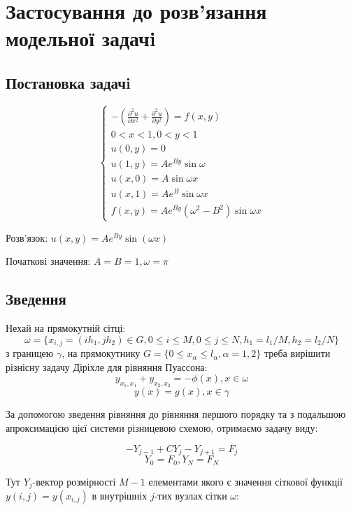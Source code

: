 \chapter{Застосування до розв’язання модельної задачi}

\section{Постановка задачi}

\begin{equation}
    \begin{cases}
        - (\frac{\partial^2 u}{\partial x ^ 2} + \frac{\partial ^2 u}{\partial y^2}) = f(x,y) \\
        0 < x < 1, 0 < y < 1 \\
        u(0,y) = 0 \\
        u(1,y) = A e^{By}\sin \omega \\
        u(x,0) = A \sin \omega x \\
        u(x,1) = A e^B \sin \omega x \\
        f(x,y) = A e^{By} (\omega^2 - B^2)\sin \omega x
    \end{cases}
\end{equation}


Розв'язок: $u(x, y) = A e^{By}\sin(\omega x)$


Початкові значення: $A=B=1, \omega = \pi$

\section{Зведення}

Нехай на прямокутній сітці:
$$ \omega = \{ x_{i,j} = (ih_1, jh_2) \in G, 
0 \le i \le M, 0 \le j \le N, h_1 = l_1 / M, h_2 = l_2 / N \} $$
з границею $\gamma$, на прямокутнику $G = \{0 \le x_\alpha \le l_\alpha, \alpha = 1,2 \}$
треба вирішити різнісну задачу Діріхле для рівняння Пуассона: 
$$ y_{x_1, x_1} + y_{x_2, x_2} = -\phi(x), x\in \omega $$
$$ y(x) = g(x), x \in \gamma $$


За допомогою зведення рівняння до рівняння першого порядку та з подальшою апроксимацією 
цієї системи різницевою схемою, отримаємо задачу виду:

$$ -Y_{j-1} + C Y_j - Y_{j+1} = F_j $$
$$ Y_0 = F_0, Y_N = F_N $$

Тут $Y_j$-вектор розмірності $M-1$ елементами якого є значення сіткової функції 
$y(i, j)= y(x_{i,j})$ в внутрішніх $j$-тих вузлах сітки $\omega$:

